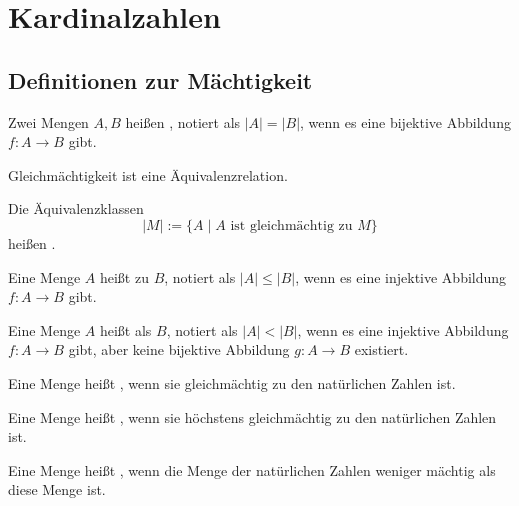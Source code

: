 \newpage
\section{Kardinalzahlen}
\subsection{Definitionen zur Mächtigkeit}

\begin{definition}[Gleichmächtigkeit]
Zwei Mengen $A,B$ heißen , notiert als
$|A|=|B|$, wenn es eine bijektive Abbildung $f\colon A\to B$ gibt.
\end{definition}
Gleichmächtigkeit ist eine Äquivalenzrelation.
\begin{definition}[Kardinalzahl]
Die Äquivalenzklassen
\begin{equation}
|M| := \{A\mid A\text{ ist gleichmächtig zu }M\}
\end{equation}
heißen .
\end{definition}

\begin{definition}
Eine Menge $A$ heißt  zu $B$,
notiert als $|A|\le|B|$, wenn es eine injektive Abbildung
$f\colon A\to B$ gibt.
\end{definition}

\begin{definition}
Eine Menge $A$ heißt  als $B$,
notiert als $|A|<|B|$, wenn es eine injektive Abbildung
$f\colon A\to B$ gibt, aber keine bijektive Abbildung
$g\colon A\to B$ existiert.
\end{definition}

\begin{definition}
Eine Menge heißt , wenn sie gleichmächtig
zu den natürlichen Zahlen ist.
\end{definition}

\begin{definition}
Eine Menge heißt , wenn sie höchstens
gleichmächtig zu den natürlichen Zahlen ist.
\end{definition}

\begin{definition}[Überabzählbar]
Eine Menge heißt , wenn die Menge der
natürlichen Zahlen weniger mächtig als diese Menge ist.
\end{definition}


